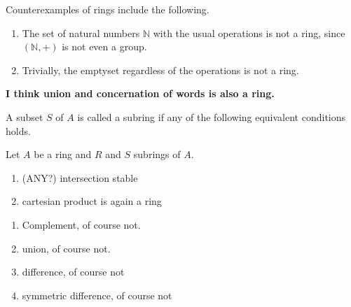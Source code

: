 %
%
%
\begin{example}
    Counterexamples of rings include the following.
    \begin{enumerate}
        \item The set of natural numbers \(\mathbb{N}\) with the usual operations is not a ring, since \((\mathbb{N}, +)\) is not even a group.
        \item Trivially, the emptyset regardless of the operations is not a ring.
    \end{enumerate}
\end{example}
\textbf{I think union and concernation of words is also a ring.}
%
%
%
\begin{defbox}
    \begin{definition}[Subring]
        A subset \(S\) of \(A\) is called a subring if any of the following equivalent conditions holds.
    \end{definition}
\end{defbox}
%
%
%
\begin{thmbox}
    \begin{proposition}
        Let \(A\) be a ring and \(R\) and \(S\) subrings of \(A\).
        \begin{enumerate}
            \item (ANY?) intersection stable
            \item cartesian product is again a ring
        \end{enumerate}
    \end{proposition}
\end{thmbox}
%
%
%
\begin{exmbox}
    \begin{example}
        \begin{enumerate}
            \item Complement, of course not.
            \item union, of course not.
            \item difference, of course not
            \item symmetric difference, of course not
        \end{enumerate}
    \end{example}
\end{exmbox}


